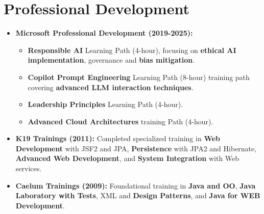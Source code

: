 
\section{Professional Development}
\begin{itemize}
    \item \footnotesize{\textbf{Microsoft Professional Development (2019-2025):}}
    \begin{itemize}
        \item \scriptsize{\textbf{Responsible AI} Learning Path (4-hour), focusing on \textbf{ethical AI implementation}, governance and \textbf{bias mitigation}.}
        \item \scriptsize{\textbf{Copilot Prompt Engineering} Learning Path (8-hour) training path covering \textbf{advanced LLM interaction techniques}.}
        \item \scriptsize{\textbf{Leadership Principles} Learning Path (4-hour).}
        \item \scriptsize{\textbf{Advanced Cloud Architectures} training Path (4-hour).}
    \end{itemize}
    \item \footnotesize{\textbf{K19 Trainings (2011):}}\scriptsize{ Completed specialized training in \textbf{Web Development} with JSF2 and JPA, \textbf{Persistence} with JPA2 and Hibernate, \textbf{Advanced Web Development}, and \textbf{System Integration} with Web services.}
    \item \footnotesize{\textbf{Caelum Trainings (2009):}}\scriptsize{ Foundational training in \textbf{Java and OO}, \textbf{Java Laboratory with Tests}, XML and \textbf{Design Patterns}, and \textbf{Java for WEB Development}.}
\end{itemize}